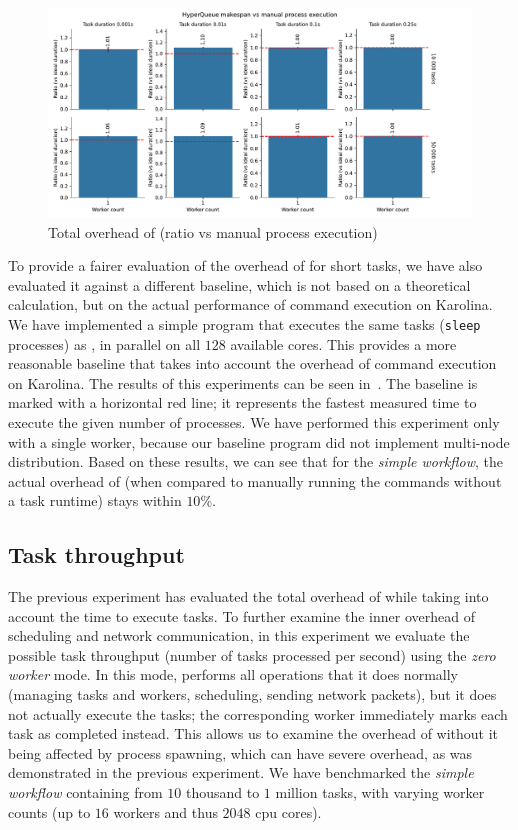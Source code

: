 \begin{figure}[h]
	\centering
	\includegraphics[width=\textwidth]{imgs/hq/charts/total-overhead-vs-manual}
	\caption{Total overhead of \hyperqueue{} (ratio vs manual process execution)}
	\label{fig:hq-overhead-vs-manual}
\end{figure}

To provide a fairer evaluation of the overhead of \hyperqueue{} for short tasks, we have
also evaluated it against a different baseline, which is not based on a theoretical calculation,
but on the actual performance of command execution on Karolina. We have implemented a simple
program that executes the same tasks (\texttt{sleep} processes) as
\hyperqueue{}, in parallel on all $128$ available cores. This provides a
more reasonable baseline that takes into account the overhead of command execution on Karolina. The
results of this experiments can be seen in~. The baseline is marked with a
horizontal red line; it represents the fastest measured time to execute the given number of
processes. We have performed this experiment only with a single worker, because our baseline
program did not implement multi-node distribution. Based on these results, we can see that for the
\emph{simple workflow}, the actual overhead of \hyperqueue{} (when compared to manually
running the commands without a task runtime) stays within
$10\%$.

\subsection{Task throughput}
\label{sec:hq-exp-task-throughput}
The previous experiment has evaluated the total overhead of \hyperqueue{} while taking
into account the time to execute tasks. To further examine the inner overhead of scheduling and
network communication, in this experiment we evaluate the possible task throughput (number of tasks
processed per second) using the \emph{zero worker} mode. In this mode, \hq{}
performs all operations that it does normally (managing tasks and workers, scheduling, sending
network packets), but it does not actually execute the tasks; the corresponding worker immediately
marks each task as completed instead. This allows us to examine the overhead of
\hyperqueue{} without it being affected by process spawning, which can have severe
overhead, as was demonstrated in the previous experiment. We have benchmarked the
\emph{simple workflow} containing from $10$ thousand to $1$
million tasks, with varying worker counts (up to $16$ workers and thus
$2048$ \gls{cpu} cores).


